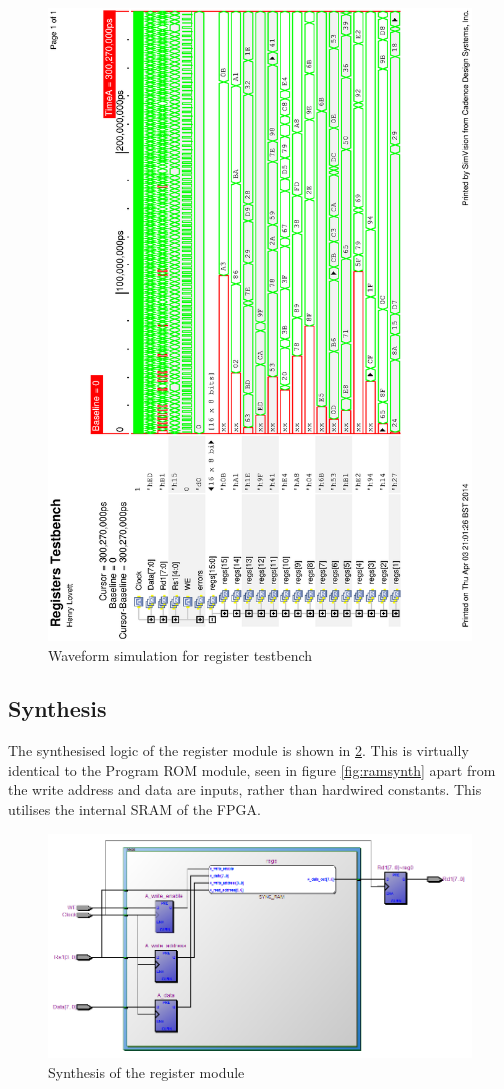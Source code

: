 \begin{figure}
\includegraphics[width=\textwidth,height=\textheight]{Figures/registerssim.eps}
\caption{Waveform simulation for register testbench}
\label{fig:regsim}
\end{figure}

\subsection{Synthesis}

The synthesised logic of the register module is shown in \ref{fig:registersynth}.
This is virtually identical to the Program ROM module, seen in figure \ref{fig:ramsynth} apart from the write address and data are inputs, rather than hardwired constants.
This utilises the internal SRAM of the FPGA. 

\begin{figure}
\includegraphics[width=\textwidth]{Figures/registersynth.png}
\caption{Synthesis of the register module}
\label{fig:registersynth}
\end{figure}
